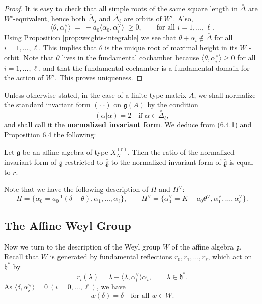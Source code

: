 \documentclass[12pt]{article}
\begin{document}
\begin{proof}
    It is easy to check that all simple roots of the same square length in $\overset{\circ}{\Delta}$ are
    $W^\circ$-equivalent, hence both $\overset{\circ}{\Delta}_s$ and $\overset{\circ}{\Delta}_\ell$ are orbits of $W^\circ$. Also,
    \[
        \langle \theta, \alpha_i^\vee \rangle \;=\; -a_0 \langle \alpha_0, \alpha_i^\vee \rangle \;\geq 0,
        \qquad \text{for all } i=1,\dots,\ell.
    \]
    Using Proposition \ref{prop:weights-integrable} we see that $\theta + \alpha_i \notin \overset{\circ}{\Delta}$ for all $i=1,\dots,\ell$.
    This implies that $\theta$ is the unique root of maximal height in its $W^\circ$-orbit. Note that $\theta$ lives in the fundamental cochamber because $\langle \theta, \alpha_i^\vee \rangle \geq 0$ for all $i=1,\dots,\ell$, and that the fundamental cochamber is a fundamental domain for the action of $W^\circ$. This proves uniqueness.
\end{proof}

Unless otherwise stated, in the case of a finite type matrix $A$, we shall
normalize the standard invariant form $(\cdot|\cdot)$ on $\mathfrak{g}(A)$ by the condition
\begin{equation}
    (\alpha|\alpha) = 2 \quad \text{if } \alpha \in \overset{\circ}{\Delta}_\ell,
    \tag{6.4.2}
\end{equation}
and shall call it the \textbf{normalized invariant form}. We deduce from (6.4.1)
and Proposition 6.4 the following:

\begin{corollary}[6.4]
    Let $\mathfrak{g}$ be an affine algebra of type $X_N^{(r)}$. Then the ratio
    of the normalized invariant form of $\mathfrak{g}$ restricted to $\overset{\circ}{\mathfrak{g}}$
    to the normalized invariant form of $\overset{\circ}{\mathfrak{g}}$ is equal to $r$.
\end{corollary}

Note that we have the following description of $\Pi$ and $\Pi^\vee$:
\[
    \Pi = \{\alpha_0 = a_0^{-1}(\delta-\theta), \alpha_1, \dots, \alpha_\ell\},
    \qquad
    \Pi^\vee = \{\alpha_0^\vee = K - a_0 \theta^\vee, \alpha_1^\vee, \dots, \alpha_\ell^\vee\}.
\]



\subsection{The Affine Weyl Group}
Now we turn to the description of the Weyl group $W$ of the affine
algebra $\mathfrak{g}$. Recall that $W$ is generated by fundamental reflections
$r_0, r_1, \dots, r_\ell$, which act on $\mathfrak{h}^*$ by
\[
    r_i(\lambda) = \lambda - \langle \lambda, \alpha_i^\vee \rangle \alpha_i,
    \qquad \lambda \in \mathfrak{h}^*.
\]
As $\langle \delta, \alpha_i^\vee \rangle = 0 \ (i=0,\dots,\ell)$, we have
\[
    w(\delta) = \delta \quad \text{for all } w \in W.
\]
\end{document}
